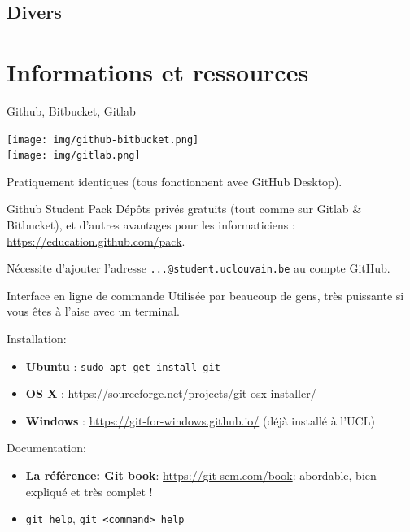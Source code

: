 \documentclass{beamer}
\begin{document}
\subsection{Divers}




\section{Informations et ressources}

\begin{frame}{Github, Bitbucket, Gitlab}
    \begin{center}
        \texttt{[image: img/github-bitbucket.png]} \\
        \texttt{[image: img/gitlab.png]}
    \end{center}
    Pratiquement identiques (tous fonctionnent avec GitHub Desktop).
\end{frame}

\begin{frame}{Github Student Pack}
    Dépôts privés gratuits (tout comme sur Gitlab \& Bitbucket), et d'autres avantages pour les informaticiens : \url{https://education.github.com/pack}.

    Nécessite d'ajouter l'adresse \texttt{...@student.uclouvain.be} au compte
    GitHub.
\end{frame}

\begin{frame}{Interface en ligne de commande}
    Utilisée par beaucoup de gens, très puissante si vous êtes à l'aise avec
    un terminal.

    Installation:
    \begin{itemize}
        \item \textbf{Ubuntu} : \texttt{sudo apt-get install git}
        \item \textbf{OS X} : \url{https://sourceforge.net/projects/git-osx-installer/}
        \item \textbf{Windows} : \url{https://git-for-windows.github.io/} (déjà
            installé à l'UCL)
    \end{itemize}

    Documentation:
    \begin{itemize}
        \item \textbf{La référence: Git book}: \url{https://git-scm.com/book}:
            abordable, bien expliqué et très complet !
        \item \texttt{git help}, \texttt{git <command> help}
    \end{itemize}
\end{frame}
\end{document}
